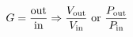 \documentclass[preview]{standalone}
\begin{document}
\begin{align*}
\special{dvisvgm:raw <g id='unique000'>}G = \frac{\text{out}}{\text{in}} \Rightarrow \frac{V_{\text{out}}}{V_{\text{in}}} \text{ or } \frac{P_{\text{out}}}{P_{\text{in}}}\special{dvisvgm:raw </g>}
\end{align*}
\end{document}
